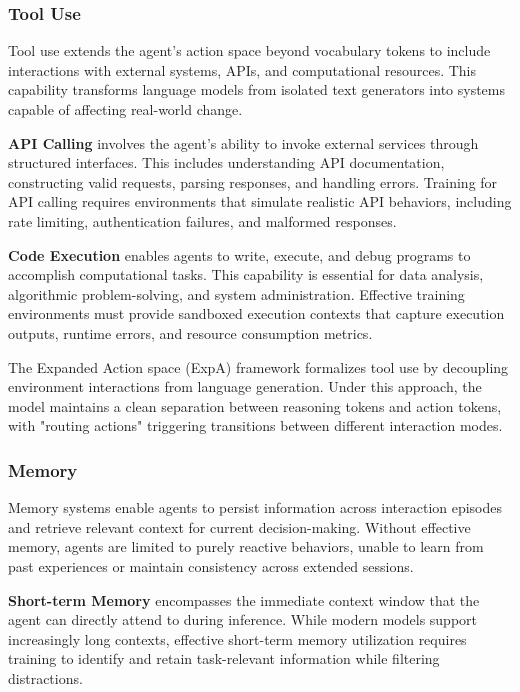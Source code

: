 \subsubsection{Tool Use}

Tool use extends the agent's action space beyond vocabulary tokens to include interactions with external systems, APIs, and computational resources. This capability transforms language models from isolated text generators into systems capable of affecting real-world change.

\textbf{API Calling} involves the agent's ability to invoke external services through structured interfaces. This includes understanding API documentation, constructing valid requests, parsing responses, and handling errors. Training for API calling requires environments that simulate realistic API behaviors, including rate limiting, authentication failures, and malformed responses.

\textbf{Code Execution} enables agents to write, execute, and debug programs to accomplish computational tasks. This capability is essential for data analysis, algorithmic problem-solving, and system administration. Effective training environments must provide sandboxed execution contexts that capture execution outputs, runtime errors, and resource consumption metrics.

The Expanded Action space (ExpA) framework formalizes tool use by decoupling environment interactions from language generation. Under this approach, the model maintains a clean separation between reasoning tokens and action tokens, with "routing actions" triggering transitions between different interaction modes.

\subsubsection{Memory}

Memory systems enable agents to persist information across interaction episodes and retrieve relevant context for current decision-making. Without effective memory, agents are limited to purely reactive behaviors, unable to learn from past experiences or maintain consistency across extended sessions.

\textbf{Short-term Memory} encompasses the immediate context window that the agent can directly attend to during inference. While modern models support increasingly long contexts, effective short-term memory utilization requires training to identify and retain task-relevant information while filtering distractions.

